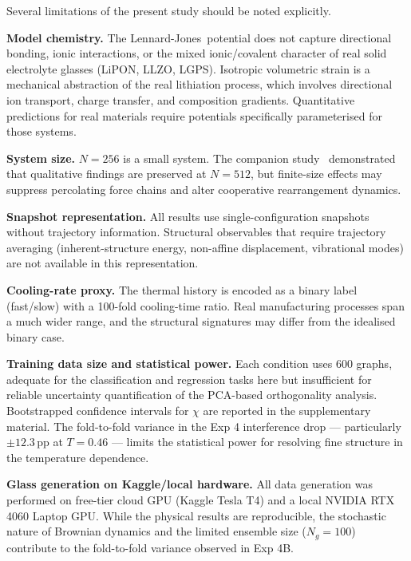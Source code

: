 \documentclass[12pt,a4paper]{article}
\newcommand{\degpp}{\,\text{pp}}
\newcommand{\xcontam}{\chi}
\newcommand{\LJ}{Lennard-Jones}
\begin{document}
Several limitations of the present study should be noted explicitly.

\textbf{Model chemistry.}
The \LJ\ potential does not capture directional bonding, ionic interactions, or the mixed ionic/covalent character of real solid electrolyte glasses (LiPON, LLZO, LGPS).
Isotropic volumetric strain is a mechanical abstraction of the real lithiation process, which involves directional ion transport, charge transfer, and composition gradients.
Quantitative predictions for real materials require potentials specifically parameterised for those systems.

\textbf{System size.}
$N = 256$ is a small system.
The companion study~\cite{Singh2025Paper2} demonstrated that qualitative findings are preserved at $N = 512$, but finite-size effects may suppress percolating force chains and alter cooperative rearrangement dynamics.

\textbf{Snapshot representation.}
All results use single-configuration snapshots without trajectory information.
Structural observables that require trajectory averaging (inherent-structure energy, non-affine displacement, vibrational modes) are not available in this representation.

\textbf{Cooling-rate proxy.}
The thermal history is encoded as a binary label (fast/slow) with a 100-fold cooling-time ratio.
Real manufacturing processes span a much wider range, and the structural signatures may differ from the idealised binary case.

\textbf{Training data size and statistical power.}
Each condition uses 600 graphs, adequate for the classification and regression tasks here but insufficient for reliable uncertainty quantification of the PCA-based orthogonality analysis.
Bootstrapped confidence intervals for $\xcontam$ are reported in the supplementary material.
The fold-to-fold variance in the Exp 4 interference drop — particularly $\pm 12.3\degpp$ at $T = 0.46$ — limits the statistical power for resolving fine structure in the temperature dependence.

\textbf{Glass generation on Kaggle/local hardware.}
All data generation was performed on free-tier cloud GPU (Kaggle Tesla T4) and a local NVIDIA RTX 4060 Laptop GPU.
While the physical results are reproducible, the stochastic nature of Brownian dynamics and the limited ensemble size ($N_g = 100$) contribute to the fold-to-fold variance observed in Exp 4B.

\end{document}
